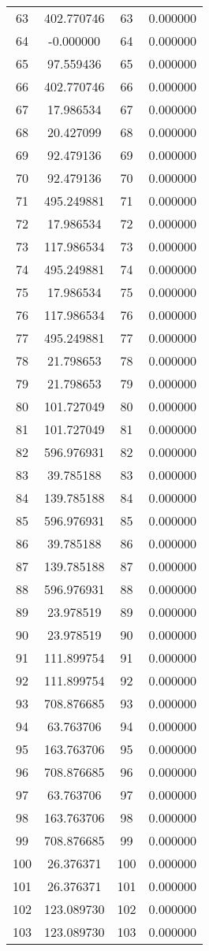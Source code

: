 \documentclass[12pt]{article}
\begin{document}
\begin{longtable}{@{}cccc@{}}
63 & 402.770746 & 63 & 0.000000 \\
64 & -0.000000 & 64 & 0.000000 \\
65 & 97.559436 & 65 & 0.000000 \\
66 & 402.770746 & 66 & 0.000000 \\
67 & 17.986534 & 67 & 0.000000 \\
68 & 20.427099 & 68 & 0.000000 \\
69 & 92.479136 & 69 & 0.000000 \\
70 & 92.479136 & 70 & 0.000000 \\
71 & 495.249881 & 71 & 0.000000 \\
72 & 17.986534 & 72 & 0.000000 \\
73 & 117.986534 & 73 & 0.000000 \\
74 & 495.249881 & 74 & 0.000000 \\
75 & 17.986534 & 75 & 0.000000 \\
76 & 117.986534 & 76 & 0.000000 \\
77 & 495.249881 & 77 & 0.000000 \\
78 & 21.798653 & 78 & 0.000000 \\
79 & 21.798653 & 79 & 0.000000 \\
80 & 101.727049 & 80 & 0.000000 \\
81 & 101.727049 & 81 & 0.000000 \\
82 & 596.976931 & 82 & 0.000000 \\
83 & 39.785188 & 83 & 0.000000 \\
84 & 139.785188 & 84 & 0.000000 \\
85 & 596.976931 & 85 & 0.000000 \\
86 & 39.785188 & 86 & 0.000000 \\
87 & 139.785188 & 87 & 0.000000 \\
88 & 596.976931 & 88 & 0.000000 \\
89 & 23.978519 & 89 & 0.000000 \\
90 & 23.978519 & 90 & 0.000000 \\
91 & 111.899754 & 91 & 0.000000 \\
92 & 111.899754 & 92 & 0.000000 \\
93 & 708.876685 & 93 & 0.000000 \\
94 & 63.763706 & 94 & 0.000000 \\
95 & 163.763706 & 95 & 0.000000 \\
96 & 708.876685 & 96 & 0.000000 \\
97 & 63.763706 & 97 & 0.000000 \\
98 & 163.763706 & 98 & 0.000000 \\
99 & 708.876685 & 99 & 0.000000 \\
100 & 26.376371 & 100 & 0.000000 \\
101 & 26.376371 & 101 & 0.000000 \\
102 & 123.089730 & 102 & 0.000000 \\
103 & 123.089730 & 103 & 0.000000 \\

\end{longtable}
\end{document}
